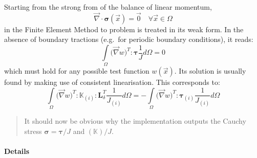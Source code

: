 \documentclass{goose-article}
\newcommand\T[1]{\bm{{#1}}}
\newcommand\TT[1]{\mathbb{{#1}}}
\begin{document}
Starting from the strong from of the balance of linear momentum,
\begin{equation}
  \vec{\nabla} \cdot \T{\sigma}(\vec{x}) = \vec{0} \quad \forall \vec{x} \in \Omega
\end{equation}
in the Finite Element Method to problem is treated in its weak form. In the absence of boundary tractions (e.g.\ for periodic boundary conditions), it reads:
\begin{equation}
  \int\limits_{\Omega} \big( \vec{\nabla} w )^T : \T{\tau} \frac{1}{J} d\Omega = 0
\end{equation}
which must hold for any possible test function $w(\vec{x})$. Its solution is usually found by making use of consistent linearisation. This corresponds to:
\begin{equation}
  \int\limits_{\Omega} \big( \vec{\nabla} w )^T : \TT{K}_{(i)} : \T{L}_\delta^T \frac{1}{J_{(i)}} d\Omega
  =
  - \int\limits_{\Omega} \big( \vec{\nabla} w )^T : \T{\tau}_{(i)} \frac{1}{J_{(i)}} d\Omega
\end{equation}


\begin{framed}
\begin{quote}
  It should now be obvious why the implementation outputs the Cauchy stress $\T{\sigma} = \T{\tau} / J$ and $(\TT{K}) / J$.
\end{quote}
\end{framed}

\paragraph{Details}
\end{document}
